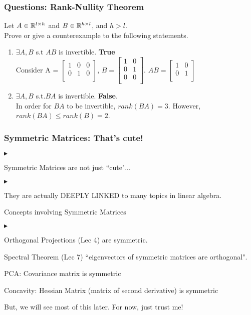 \documentclass{beamer}
\renewenvironment{itemize}
\renewenvironment{enumerate}%
{\begin{list}{\arabic{enumi}.}%
      {\setlength{\leftmargin}{2.5em}%
       \setlength{\itemsep}{-\parsep}%
       \setlength{\topsep}{-\parskip}%
       \usecounter{enumi}}%
 }{\end{list}}
\renewenvironment{itemize}%
{\begin{list}{$\blacktriangleright$}%
      {\setlength{\leftmargin}{2.5em}%
       \setlength{\itemsep}{-\parsep}%
       \setlength{\topsep}{-\parskip}%
       \usecounter{enumi}}%
 }{\end{list}}
\begin{document}
\begin{frame}
\frametitle{Questions: Rank-Nullity Theorem}
Let $A\in \mathbb{R}^{l\times h}$ and $B\in \mathbb{R}^{h\times l}$, and $h>l$.\\
Prove or give a counterexample to the following statements.
\begin{solution}
\begin{enumerate}
\item $\exists A,B$ s.t $AB$ is invertible.
 \textbf{True}\\
Consider 
A = $\begin{bmatrix}
1 & 0 & 0 \\
0 & 1 & 0 \\
\end{bmatrix}$, $
B = \begin{bmatrix}
1 & 0 \\
0 & 1 \\
0 & 0 \\
\end{bmatrix}$. 
$AB= \begin{bmatrix}
1 & 0 \\
0 & 1 \\
\end{bmatrix}$ 
\medskip
\item $\exists A,B$ s.t.$BA$ is invertible.
\textbf{False}.\\
In order for $BA$ to be invertible, $rank(BA)=3$. However, $rank(BA) \leq rank(B)=2$.
\end{enumerate}
\end{solution}
\end{frame}


\begin{frame}
\frametitle{Symmetric Matrices: That's cute!}
\begin{itemize}

\item Symmetric Matrices are not just ``cute"...\\
	\begin{itemize}
	\item They are actually DEEPLY LINKED to many topics in linear algebra.\\
	\end{itemize}
\item Concepts involving Symmetric Matrices
\begin{itemize}
\item Orthogonal Projections (Lec 4) are symmetric.\\
\item Spectral Theorem (Lec 7) ``eigenvectors of symmetric matrices are orthogonal".\\
\item PCA: Covariance matrix is symmetric
\item Concavity: Hessian Matrix (matrix of second derivative) is symmetric
\end{itemize}
\item But, we will see most of this later. For now, just trust me!
\end{itemize}
\end{frame}
\end{document}
